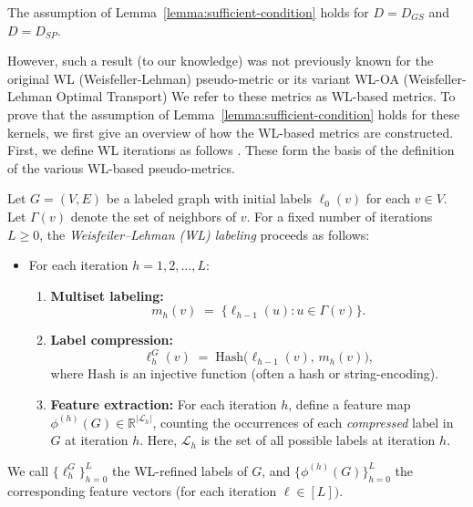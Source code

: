 \begin{lemma}\label{lemma:partial} The assumption of Lemma~\ref{lemma:sufficient-condition} holds for $D = D_{GS}$ and $D= D_{SP}$. 
\end{lemma}

However, such a result (to our knowledge) was not previously known for the original WL (Weisfeller-Lehman) pseudo-metric or its variant WL-OA (Weisfeller-Lehman Optimal Transport) 
 We refer to these metrics as WL-based metrics. To prove that the assumption of Lemma~\ref{lemma:sufficient-condition} holds for these kernels, we first give an overview of how the WL-based metrics are constructed. First, we define WL iterations as follows \citep{zhang2017weisfeiler, shervashidze2011weisfeiler}. These form the basis of the definition of the various WL-based pseudo-metrics. 

\begin{definition}\label{def:WL-iterations}
  Let \(G = (V, E)\) be a labeled graph with initial labels \(\ell_0(v)\) for each \(v \in V\).
  Let \(\Gamma(v)\) denote the set of neighbors of \(v\).
  For a fixed number of iterations \(L \ge 0\), the \emph{Weisfeiler--Lehman (WL) labeling} proceeds as follows:

  \begin{itemize}
    \item For each iteration \(h = 1, 2, \dots, L\):
    \begin{enumerate}
      \item \textbf{Multiset labeling:} 
        \[
          m_h(v) \;=\; \{\ell_{h-1}(u) : u \in \Gamma(v)\}.
        \]
      \item \textbf{Label compression:} 
        \[
          \ell_h^G(v) \;=\; \mathrm{Hash}\!\bigl(\ell_{h-1}(v),\, m_h(v)\bigr),
        \]
        where \(\mathrm{Hash}\) is an injective function (often a hash or string-encoding).
      \item \textbf{Feature extraction:} For each iteration \(h\),
        define a feature map \(\phi^{(h)}(G)\in\mathbb{R}^{|\mathcal{L}_h|}\), 
        counting the occurrences of each \emph{compressed} label in \(G\) at iteration \(h\).
        Here, \(\mathcal{L}_h\) is the set of all possible labels at iteration \(h\).
    \end{enumerate}
  \end{itemize}

We call \(\{\ell_h^G\}_{h=0}^L\) the WL-refined labels of \(G\), and
  \(\{\phi^{(h)}(G)\}_{h=0}^L\) the corresponding feature vectors (for each iteration $\ell \in [L])$.
\end{definition}

